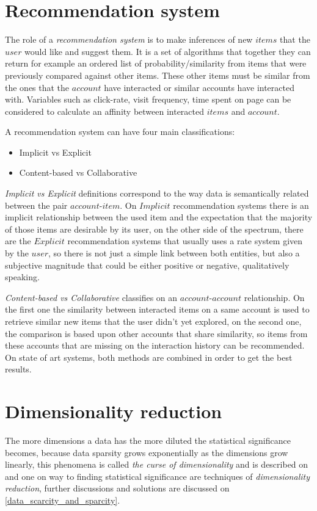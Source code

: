 \documentclass[ecp,tc,english]{iiufrgs}
\begin{document}
        \section{Recommendation system}
        The role of a \textit{recommendation system} is to make inferences of new \(items\) that the \(user\) would like and suggest them. It is a set of algorithms that together they can return for example an ordered list of probability/similarity from items that were previously compared against other items. These other items must be similar from the ones that the \(account\) have interacted or similar accounts have interacted with.
        Variables such as click-rate, visit frequency, time spent on page can be considered to calculate an affinity between interacted \(items\) and \(account\).

        A recommendation system can have four main classifications:
        \begin{itemize} 
            \item Implicit vs Explicit
            \item Content-based vs Collaborative
        \end{itemize}

        \textit{Implicit vs Explicit} definitions correspond to the way data is semantically related between the pair \(account\)-\(item\). On \(Implicit\) recommendation systems there is an implicit relationship between the used item and the expectation that the majority of those items are desirable by its user, on the other side of the spectrum, there are the \(Explicit\) recommendation systems that usually uses a rate system given by the \(user\), so there is not just a simple link between both entities, but also a subjective magnitude that could be either positive or negative, qualitatively speaking.

        \textit{Content-based vs Collaborative} classifies on an \(account\)-\(account\) relationship. On the first one the similarity between interacted items on a same account is used to retrieve similar new items that the user didn't yet explored, on the second one, the comparison is based upon other accounts that share similarity, so items from these accounts that are missing on the interaction history can be recommended. On state of art systems, both methods are combined in order to get the best results.    
        
        \section{Dimensionality reduction} \label{dimensionality_reduction}
        The more dimensions a data has the more diluted the statistical significance becomes, 
        because data sparsity grows exponentially as the dimensions grow linearly,  
        this phenomena is called \textit{the curse of dimensionality} and is described on \cite{marimont1979} and one on way to finding statistical significance are techniques of \textit{dimensionality reduction}, further discussions and solutions are discussed on \ref{data_scarcity_and_sparcity}.
        
\end{document}
